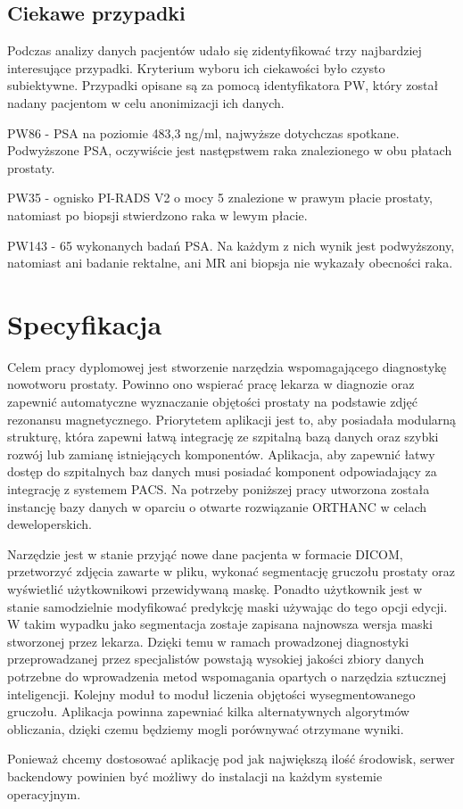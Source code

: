 \documentclass[a4paper,11pt,twoside]{report}
\theoremstyle{definition}
\begin{document}
\section{Ciekawe przypadki}
Podczas analizy danych pacjentów udało się zidentyfikować trzy najbardziej interesujące przypadki. Kryterium wyboru ich ciekawości było czysto subiektywne. Przypadki opisane są za pomocą identyfikatora PW, który został nadany pacjentom w celu anonimizacji ich danych.
\par
\begin{description}
\item  PW86 - PSA na poziomie 483,3 ng/ml, najwyższe dotychczas spotkane. Podwyższone PSA, oczywiście jest następstwem raka znalezionego w obu płatach prostaty.
\item  PW35 - ognisko PI-RADS V2 o mocy 5 znalezione w prawym płacie prostaty, natomiast po biopsji stwierdzono raka w lewym płacie.
\item  PW143 - 65 wykonanych badań PSA. Na każdym z nich wynik jest podwyższony, natomiast ani badanie rektalne, ani MR ani biopsja nie wykazały obecności raka.
\end{description}


\chapter{Specyfikacja} %

Celem pracy dyplomowej jest stworzenie narzędzia wspomagającego diagnostykę nowotworu prostaty. Powinno ono wspierać pracę lekarza w diagnozie oraz zapewnić automatyczne wyznaczanie objętości prostaty na podstawie zdjęć rezonansu magnetycznego. Priorytetem aplikacji jest to, aby posiadała modularną strukturę, która zapewni łatwą integrację ze szpitalną bazą danych oraz szybki rozwój lub zamianę istniejących komponentów. Aplikacja, aby zapewnić łatwy dostęp do szpitalnych baz danych musi posiadać komponent odpowiadający za integrację z systemem PACS. Na potrzeby poniższej pracy utworzona została instancję bazy danych w oparciu o otwarte rozwiązanie ORTHANC \cite{Orthanc} w celach deweloperskich.
\par
Narzędzie jest w stanie przyjąć nowe dane pacjenta w formacie DICOM, przetworzyć zdjęcia zawarte w pliku, wykonać segmentację gruczołu prostaty oraz wyświetlić użytkownikowi przewidywaną maskę. Ponadto użytkownik jest w stanie samodzielnie modyfikować predykcję maski używając do tego opcji edycji. W takim wypadku jako segmentacja zostaje zapisana najnowsza wersja maski stworzonej przez lekarza. Dzięki temu w ramach prowadzonej diagnostyki przeprowadzanej przez specjalistów powstają wysokiej jakości zbiory danych potrzebne do wprowadzenia metod wspomagania opartych o narzędzia sztucznej inteligencji. Kolejny moduł to moduł liczenia objętości wysegmentowanego gruczołu. Aplikacja powinna zapewniać kilka alternatywnych algorytmów obliczania, dzięki czemu będziemy mogli porównywać otrzymane wyniki.
\par
Ponieważ chcemy dostosować aplikację pod jak największą ilość środowisk, serwer backendowy powinien być możliwy do instalacji na każdym systemie operacyjnym.
\end{document}

